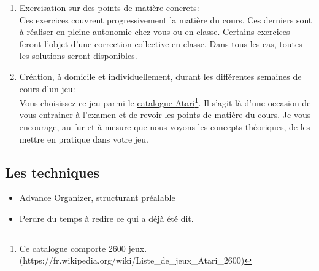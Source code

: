 \begin{enumerate}
    \item Exercisation sur des points de matière concrets:\\Ces exercices couvrent progressivement la matière du cours. Ces derniers sont à réaliser en pleine autonomie chez vous ou en classe. Certains exercices feront l'objet d'une correction collective en classe. Dans tous les cas, toutes les solutions seront disponibles.
    \item Création, à domicile et individuellement, durant les différentes semaines de cours d’un jeu:\\Vous choisissez ce jeu parmi le \href{https://fr.wikipedia.org/wiki/Liste_de_jeux_Atari_2600}{catalogue Atari}\footnote{Ce catalogue comporte 2600 jeux.(https://fr.wikipedia.org/wiki/Liste\_de\_jeux\_Atari\_2600)}. Il s’agit là d’une occasion de vous entrainer à l’examen et de revoir les points de matière du cours. Je vous encourage, au fur et à mesure que nous voyons les concepts théoriques, de les mettre en pratique dans votre jeu.
\end{enumerate}
\subsection{Les techniques}
\begin{itemize}
    \item Advance Organizer, structurant préalable
    \item Perdre du temps à redire ce qui a déjà été dit.
\end{itemize}



\clearpage
